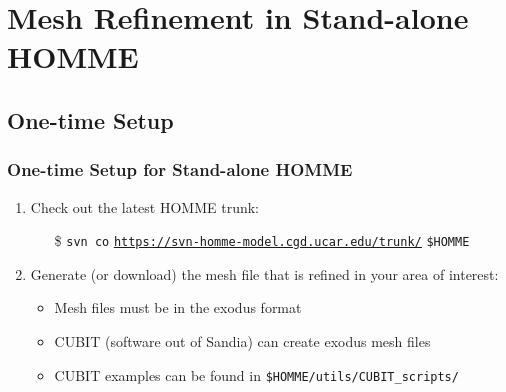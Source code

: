 \documentclass{beamer}
\begin{document}
\section{Mesh Refinement in Stand-alone HOMME}
\subsection{One-time Setup}
\begin{frame}
\frametitle{One-time Setup for Stand-alone HOMME}
\begin{block}{}
\begin{enumerate}
\item Check out the latest HOMME trunk:
\begin{itemize}
\item[\$] \texttt{svn co}
\href{https://svn-homme-model.cgd.ucar.edu/trunk/}{\texttt{\underline{https://svn-homme-model.cgd.ucar.edu/trunk/}}} \texttt{\$HOMME}
\end{itemize}
\item Generate (or download) the mesh file that is refined in your area of interest:
\begin{itemize}
\item Mesh files must be in the exodus format
\item CUBIT (software out of Sandia) can create exodus mesh files
\item CUBIT examples can be found in \texttt{\$HOMME/utils/CUBIT\_scripts/}
\end{itemize}
\end{enumerate}
\end{block}
\end{frame}
%
\end{document}
